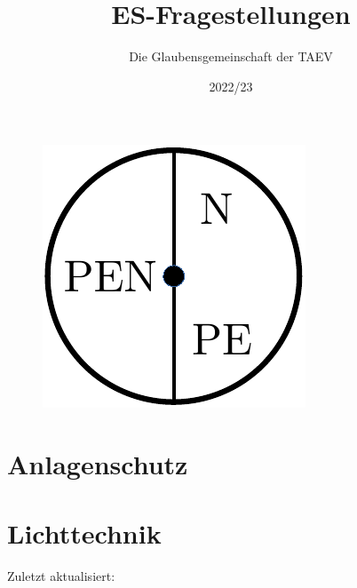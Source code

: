 \documentclass[12pt]{article}
\title{\LARGE \textbf{ES-Fragestellungen}}
\date{2022/23}
\author{Die Glaubensgemeinschaft der TAEV}
\begin{document}
    \lhead{}
    \rhead{}

    \begin{titlepage}
        \begin{figure}
            \centering
            \includegraphics{nullung.pdf}
        \end{figure}

        \maketitle 

        \tableofcontents
    \end{titlepage}


    \lfoot{}
    \cfoot{}


    \section{Anlagenschutz}
    
    

    \section{Lichttechnik}
    
    

    \vfill
    \footnotesize Zuletzt aktualisiert: \filemodprintdate{\jobname}
\end{document}
